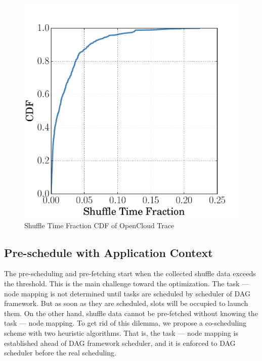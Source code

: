\begin{figure}
	\centering
	\includegraphics[width=0.6\linewidth]{fig/reduce_cdf}
	\caption{Shuffle Time Fraction CDF of OpenCloud Trace}
	\label{fig:cdf}
\end{figure}
\subsection{Pre-schedule with Application Context}
The pre-scheduling and pre-fetching start when the collected shuffle data exceeds the threshold.
This is the main challenge toward the optimization. The task --- node mapping is not determined until tasks are scheduled by scheduler of DAG framework. But as soon as they are scheduled, slots will be occupied to launch them. On the other hand, shuffle data cannot be pre-fetched without knowing the task --- node mapping.
To get rid of this dilemma, we propose a co-scheduling scheme with two heuristic algorithms. That is, the task --- node mapping is established ahead of DAG framework scheduler, and it is enforced to DAG scheduler before the real scheduling.


